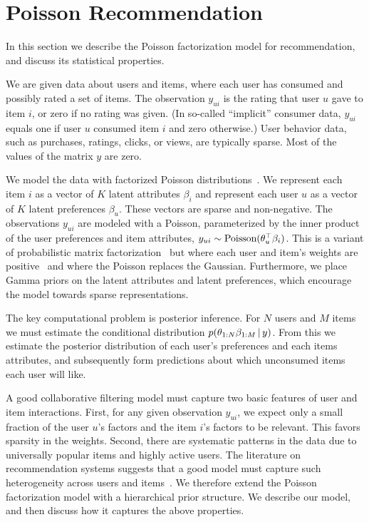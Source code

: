 \section{Poisson Recommendation}
\label{sec:model}


In this section we describe the Poisson factorization model for
recommendation, and discuss its statistical properties.

We are given data about users and items, where each user has consumed
and possibly rated a set of items.  The observation $y_{ui}$ is the
rating that user $u$ gave to item $i$, or zero if no rating was given.
(In so-called ``implicit'' consumer data, $y_{ui}$ equals one if user
$u$ consumed item $i$ and zero otherwise.)  User behavior data, such
as purchases, ratings, clicks, or views, are typically sparse.  Most
of the values of the matrix $y$ are zero.

We model the data with factorized Poisson
distributions~\cite{Canny:2004}.  We represent each item $i$ as a
vector of $K$ latent attributes $\beta_i$ and represent each user $u$
as a vector of $K$ latent preferences $\beta_u$.  These vectors are
sparse and non-negative.  The observations $y_{ui}$ are modeled with a
Poisson, parameterized by the inner product of the user preferences
and item attributes, $y_{ui} \sim \textrm{Poisson}(\theta_u^\top \beta_i)$.
This is a variant of probabilistic matrix
factorization~\cite{Salakhutdinov:2008a} but where each user and
item's weights are positive~\cite{Lee:1999} and where the Poisson
replaces the Gaussian.  Furthermore, we place Gamma priors on the
latent attributes and latent preferences, which encourage the model
towards sparse representations.

The key computational problem is posterior inference.  For $N$ users
and $M$ items we must estimate the conditional distribution
$p(\theta_{1:N} \beta_{1:M} \,\vert\, y)$.  From this we estimate the
posterior distribution of each user's preferences and each items
attributes, and subsequently form predictions about which unconsumed
items each user will like.

A good collaborative filtering model must capture two basic features
of user and item interactions. First, for any given observation
$y_{ui}$, we expect only a small fraction of the user $u$'s factors
and the item $i$'s factors to be relevant. This favors sparsity in the
weights. Second, there are systematic patterns in the data due to
universally popular items and highly active users. The literature on
recommendation systems suggests that a good model must capture such
heterogeneity across users and items~\cite{Koren:2009}. We therefore
extend the Poisson factorization model with a hierarchical prior
structure. We describe our model, and then discuss how it captures the
above properties.

